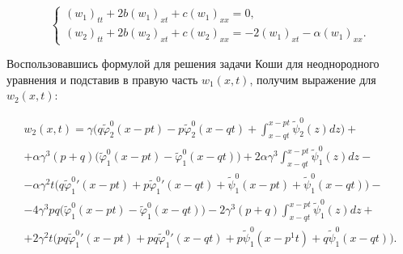 \begin{equation*}

\left\{

  \begin{array}{l}

    (w_1)_{tt}+2b(w_1)_{xt}+c(w_1)_{xx}=0, \\

    (w_2)_{tt}+2b(w_2)_{xt}+c(w_2)_{xx}=-2(w_1)_{xt}-\alpha(w_1)_{xx}.

  \end{array}

\right.

\end{equation*}

Воспользовавшись формулой для решения задачи Коши для неоднородного уравнения и подставив в правую часть $w_1(x,t)$, получим выражение для $w_2(x,t)$:

\begin{multline*}

w_2(x,t)=\gamma\biggl(q\tilde{\varphi}_2^0(x-pt)-p\tilde{\varphi}_2^0(x-qt)+\int\nolimits_{x-qt}^{x-pt}{\tilde{\psi}_2^0(z)dz}\biggr)+\\

+

\alpha{\gamma^{3}}(p+q)\bigl( \tilde{\varphi}_1^0(x-pt)-\tilde{\varphi}_1^0(x-qt) \bigr)

+2\alpha{\gamma^{3}}\int\nolimits_{x-qt}^{x-pt}{\tilde{\psi}_1^0(z)dz}-\\

-\alpha{\gamma^{2}}t\bigl(q{\tilde{\varphi}_1^0}{'}(x-pt)+p{\tilde{\varphi}_1^0}{'}(x-qt)+

\tilde{\psi}_1^0(x-pt)+\tilde{\psi}_1^0(x-qt)

\bigr)-\\

-

4{\gamma^{3}}pq\bigl( \tilde{\varphi}_1^0(x-pt)-\tilde{\varphi}_1^0(x-qt) \bigr)

-2{\gamma^{3}}(p+q)\int\nolimits_{x-qt}^{x-pt}{\tilde{\psi}_1^0(z)dz}+\\

+2{\gamma^{2}}t\bigl(pq{\tilde{\varphi}_1^0}{'}(x-pt)+pq{\tilde{\varphi}_1^0}{'}(x-qt)+

p\tilde{\psi}_1^0(x-p^1t)+q\tilde{\psi}_1^0(x-qt)

\bigr).

\end{multline*}



